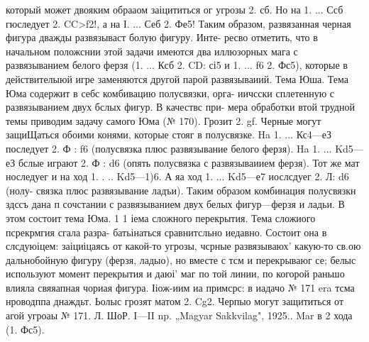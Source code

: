 который может двояким обрааом заіцититься ог угрозы 2. сб. Но на 1. ... Ссб гюследует 2. CC>f2!, а на І. ... Себ 2. Фе5! Таким образом, развязанная черная фигура дважды развязываст болую фигуру. Инте- ресво отметить, что в начальном положснии этой задачи имеются два иллюзорных мага с развязыванием белого ферзя (1. ... Ксб 2. CD: сі5 и 1. ... f6 2. Фс5), которые в действителыюй игре заменяются другой парой развязываиий.
    Тема Юша. Тема Юма содержит в себс комбивацию полусвязки, орга- иичсски сплетенную с развязыванием двух бслых фигур. В качествс при- мера обработки втой трудной темы приводим задачу самого Юма (№ 170). Грозит 2. gf. Черные могут защиЩаться обоими конями, которые стояг в полусвязке. Ha 1. ... Кс4—еЗ последует 2. Ф : f6 (полусвязка плюс развязывание белого ферзя). Ha 1. ... Kd5—еЗ бслые играют 2. Ф : d6 (опять полусвязка с развязываиием ферзя). Тот же мат носледуег и на ход 1. . .. Kd5—1)6. А яа ход 1. ... Kd5—е7 иослсдуег 2. Л: d6 (нолу- связка плюс развязывание ладъи). Таким образом комбинация полусвязкн здссъ дана п сочстании с развязыванием двух белых фигур—ферзя и ладьи. В этом состоит тема Юма.	1 1
    іема сложного перекрытия. Тема сложиого псрекрмгия сгала разра- батьінаться сравнитсльно иедавно. Состоит она в слсдуюіцем: заіциіцаясь от какой-то угрозы, чсрные развязываюх' какую-то св.ою дальнобойную фигуру (ферзя, ладыо), но вместе с тсм и перекрываюг се; белыс используют момент перекрытия и даюі' маг по той линии, по когорой раньшо влияла свяяапная чориая фигура.
    Ііож-иим иа примсрс: в иадачо № 171 era тсма нроводппа днаждьт. Ьолыс грозят матом 2. Cg2. Черпыо могут защититься от агой угроаы
№ 171. Л. ШоР.
I—II np. „Magyar Sakkvilag", 1925..
Mar в 2 хода (1. Фс5).	

